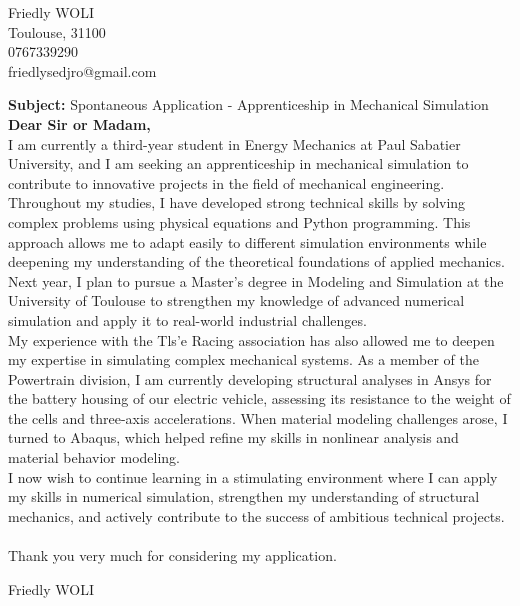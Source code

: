\documentclass[11pt,a4paper]{article}
\begin{document}
	\pagestyle{empty}

	\noindent
	Friedly WOLI \\  %
	Toulouse, 31100  \\
	0767339290 \\
	friedlysedjro@gmail.com \\
	
	
	\bigskip
	
		 \textbf{ Subject:} Spontaneous Application - Apprenticeship in Mechanical Simulation \\ 
		
		
	\textbf{Dear Sir or Madam,} \\
	
	I am currently a third-year student in Energy Mechanics at Paul Sabatier University, and I am seeking an apprenticeship in mechanical simulation to contribute to innovative projects in the field of mechanical engineering.\\ 
	
	Throughout my studies, I have developed strong technical skills by solving complex problems using physical equations and Python programming. This approach allows me to adapt easily to different simulation environments while deepening my understanding of the theoretical foundations of applied mechanics. Next year, I plan to pursue a Master's degree in Modeling and Simulation at the University of Toulouse to strengthen my knowledge of advanced numerical simulation and apply it to real-world industrial challenges.\\
	
	My experience with the Tls'e Racing association has also allowed me to deepen my expertise in simulating complex mechanical systems. As a member of the Powertrain division, I am currently developing structural analyses in Ansys for the battery housing of our electric vehicle, assessing its resistance to the weight of the cells and three-axis accelerations. When material modeling challenges arose, I turned to Abaqus, which helped refine my skills in nonlinear analysis and material behavior modeling.\\ 
	
	I now wish to continue learning in a stimulating environment where I can apply my skills in numerical simulation, strengthen my understanding of structural mechanics, and actively contribute to the success of ambitious technical projects.\\ \\
	
	Thank you very much for considering my application.
	
		
		
		\vspace{0.8cm}
	
		
	
		
			
	
	\begin{flushright}

		Friedly WOLI
		
	\end{flushright}
	
	
\end{document}
